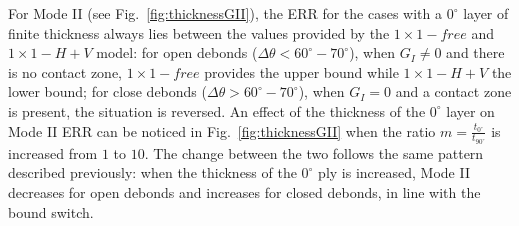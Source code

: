 \documentclass[review]{elsarticle}
\begin{document}
For Mode II (see Fig.~\ref{fig:thicknessGII}), the ERR for the cases with a $0^{\circ}$ layer of finite thickness always lies between the values provided by the $1\times 1-free$ and $1\times 1-H+V$ model: for open debonds ($\Delta\theta<60^{\circ}-70^{\circ}$), when $G_{I}\neq0$ and there is no contact zone, $1\times 1-free$ provides the upper bound while $1\times 1-H+V$ the lower bound; for close debonds ($\Delta\theta>60^{\circ}-70^{\circ}$), when $G_{I}=0$ and a contact zone is present, the situation is reversed. An effect of the thickness of the $0^{\circ}$ layer on Mode II ERR can be noticed in Fig.~\ref{fig:thicknessGII} when the ratio $m=\frac{t_{0^{\circ}}}{t_{90^{\circ}}}$ is increased from $1$ to $10$. The change between the two follows the same pattern described previously: when the thickness of the $0^{\circ}$ ply is increased, Mode II decreases for open debonds and increases for closed debonds, in line with the bound switch.\\
\end{document}
